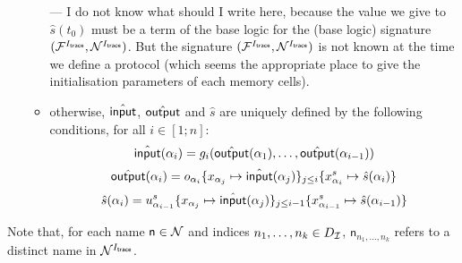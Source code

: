 \begin{definition}
\begin{itemize}
\begin{itemize}
{      ---
      I do not know what should I write here, because the value we give to
      $\hat{s}(t_0)$ must be a term of the base logic for the (base logic)
      signature $(\mathcal{F}^{I_{\textsf{trace}}},\mathcal{N}^{I_{\textsf{trace}}})$.
      But the signature $(\mathcal{F}^{I_{\textsf{trace}}},\mathcal{N}^{I_{\textsf{trace}}})$ is not known at the time
      we define a protocol (which seems the appropriate place to give the
      initialisation parameters of each memory cells).}
      \item otherwise, $\hat{\textsf{input}}$, $\hat{\textsf{output}}$ and $\hat{s}$
      are uniquely defined by the following
      conditions, for all $i\in[1;n]$:
      $$\hat{\textsf{input}}(\alpha_i) =
      g_{i}(\hat{\textsf{output}}(\alpha_1),\ldots,\hat{\textsf{output}}(\alpha_{i-1}))$$
      $$\hat{\textsf{output}}(\alpha_i) = o_{\alpha_i}
      \{x_{\alpha_j}\mapsto\hat{\textsf{input}}(\alpha_j)\}_{j \leq i}
      \{x^s_{\alpha_i}\mapsto\hat{s}(\alpha_i)\}$$
      $$\hat{s}(\alpha_i) = u_{\alpha_{i-1}}^{s}
      \{x_{\alpha_j}\mapsto\hat{\textsf{input}}(\alpha_j)\}_{j \leq i-1}\{
      x^s_{\alpha_{i-1}}\mapsto\hat{s}(\alpha_{i-1})\}$$
    \end{itemize}
  \end{itemize}
\end{definition}

Note that, for each name $\mathsf{n}\in \mathcal{N}$ and indices $n_1,\ldots,n_k \in
D_{\mathcal{I}}$, $\mathsf{n}_{n_1,\ldots,n_k}$ refers to a distinct name in $\mathcal{N}^{I_{\textsf{trace}}}$.

